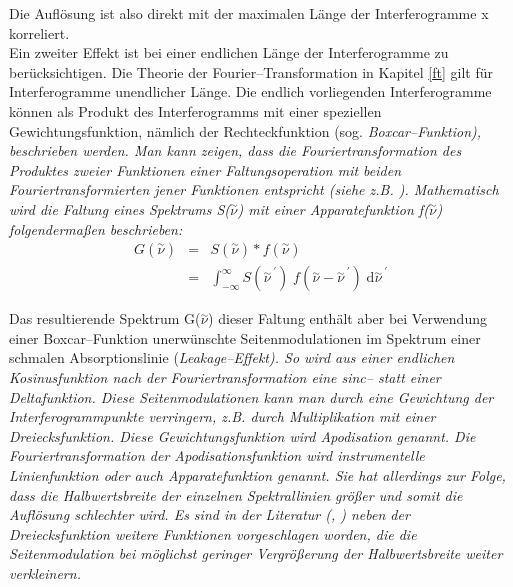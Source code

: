 Die Auflösung ist also direkt mit der maximalen Länge der
Interferogramme x korreliert.\\

Ein zweiter Effekt ist bei einer endlichen Länge der
Interferogramme zu berücksichtigen. Die Theorie der
Fourier--Transformation in Kapitel \ref{ft} gilt für
Interferogramme unendlicher Länge. Die endlich vorliegenden
Interferogramme können als Produkt des Interferogramms mit einer
speziellen Gewichtungsfunktion, nämlich der Rechteckfunktion (sog.
\it Boxcar--\rm Funktion), beschrieben werden. Man kann zeigen,
dass die Fouriertransformation des Produktes zweier Funktionen
einer Faltungsoperation mit beiden Fouriertransformierten jener
Funktionen entspricht (siehe z.B. \cite{griffiths86}).
Mathematisch wird die Faltung eines Spektrums
S($\stackrel{\sim}{\nu}$) mit einer Apparatefunktion
f($\stackrel{\sim}{\nu}$) folgenderma{\ss}en beschrieben:
\begin{eqnarray}\label{eqconv}
  G(\stackrel{\sim}{\nu}) & = & S(\stackrel{\sim}{\nu})*f(\stackrel{\sim}{\nu})\nonumber\\
& = & \int^{\infty}_{-\infty} S(\stackrel{\sim}{\nu}^{\:\prime})
\; f(\stackrel{\sim}{\nu}-\stackrel{\sim}{\nu}^{\:\prime})\;
\text{d}\!\stackrel{\sim}{\nu}^{\:\prime}
\end{eqnarray}

Das resultierende Spektrum G($\stackrel{\sim}{\nu}$) dieser
Faltung enthält aber bei Verwendung einer Boxcar--Funktion
unerwünschte Seitenmodulationen im Spektrum einer schmalen
Absorptionslinie (\it Leakage--Effekt\rm ). So wird aus einer
endlichen Kosinusfunktion nach der Fouriertransformation eine
sinc-- statt einer Deltafunktion. Diese Seitenmodulationen kann
man durch eine Gewichtung der Interferogrammpunkte verringern,
z.B. durch Multiplikation mit einer Dreiecksfunktion. Diese
Gewichtungsfunktion wird \it Apodisation \rm genannt. Die
Fouriertransformation der Apodisationsfunktion wird \it
instrumentelle Linienfunktion \rm oder auch \it Apparatefunktion
\rm genannt. Sie hat allerdings zur Folge, dass die
Halbwertsbreite der einzelnen Spektrallinien grö{\ss}er und somit die
Auflösung schlechter wird. Es sind in der Literatur
(\cite{zhu198}, \cite{zhu298}) neben der Dreiecksfunktion weitere
Funktionen vorgeschlagen worden, die die Seitenmodulation bei
möglichst geringer Vergrö{\ss}erung der Halbwertsbreite weiter
verkleinern.\\

